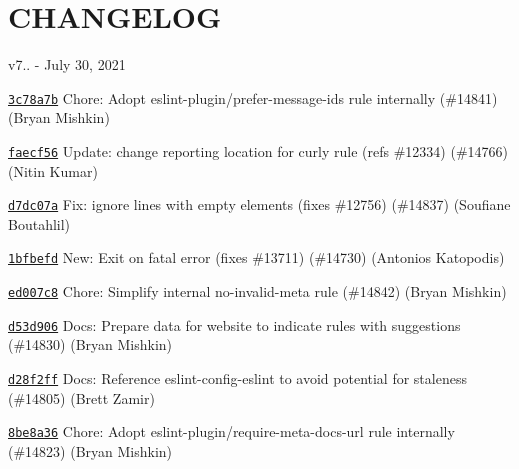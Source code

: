 \chapter{CHANGELOG}
\hypertarget{md__c_1_2_users_2_s_t_r_i_d_e_r_2source_2repos_2_internal_a_p_i_2_internal_a_p_i_2wwwroot_2lib_201bcc0dca7e397c16eb4853543f4e009}{}\label{md__c_1_2_users_2_s_t_r_i_d_e_r_2source_2repos_2_internal_a_p_i_2_internal_a_p_i_2wwwroot_2lib_201bcc0dca7e397c16eb4853543f4e009}
v7.. -\/ July 30, 2021


\begin{DoxyItemize}
\item \href{https://github.com/eslint/eslint/commit/3c78a7bff6044fd196ae3b737983e6744c6eb7c8}{\texttt{ {\ttfamily 3c78a7b}}} Chore\+: Adopt {\ttfamily eslint-\/plugin/prefer-\/message-\/ids} rule internally (\#14841) (Bryan Mishkin)
\item \href{https://github.com/eslint/eslint/commit/faecf56cdb4146b28bfa4f1980adb41b4d3614b1}{\texttt{ {\ttfamily faecf56}}} Update\+: change reporting location for {\ttfamily curly} rule (refs \#12334) (\#14766) (Nitin Kumar)
\item \href{https://github.com/eslint/eslint/commit/d7dc07a15e256cee9232183165e2f6102f2c0873}{\texttt{ {\ttfamily d7dc07a}}} Fix\+: ignore lines with empty elements (fixes \#12756) (\#14837) (Soufiane Boutahlil)
\item \href{https://github.com/eslint/eslint/commit/1bfbefdaaf19ef32df42b89a3f5d32cff1e5b831}{\texttt{ {\ttfamily 1bfbefd}}} New\+: Exit on fatal error (fixes \#13711) (\#14730) (Antonios Katopodis)
\item \href{https://github.com/eslint/eslint/commit/ed007c82ee9d2170c87500d98303554b5f90b915}{\texttt{ {\ttfamily ed007c8}}} Chore\+: Simplify internal {\ttfamily no-\/invalid-\/meta} rule (\#14842) (Bryan Mishkin)
\item \href{https://github.com/eslint/eslint/commit/d53d9064b9dd0dd6a8ea39e07b16310c8364db69}{\texttt{ {\ttfamily d53d906}}} Docs\+: Prepare data for website to indicate rules with suggestions (\#14830) (Bryan Mishkin)
\item \href{https://github.com/eslint/eslint/commit/d28f2ffb986e49d6da5c1d91215580591f4cfd35}{\texttt{ {\ttfamily d28f2ff}}} Docs\+: Reference eslint-\/config-\/eslint to avoid potential for staleness (\#14805) (Brett Zamir)
\item \href{https://github.com/eslint/eslint/commit/8be8a36010145dfcd31cbdd4f781a91989e3b1bd}{\texttt{ {\ttfamily 8be8a36}}} Chore\+: Adopt {\ttfamily eslint-\/plugin/require-\/meta-\/docs-\/url} rule internally (\#14823) (Bryan Mishkin)

\end{DoxyItemize}
